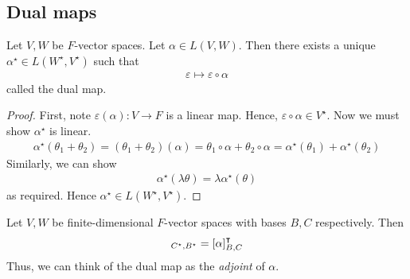 \subsection{Dual maps}
\begin{lemma}
	Let $V, W$ be $F$-vector spaces.
	Let $\alpha \in L(V,W)$.
	Then there exists a unique $\alpha^\star \in L(W^\star, V^\star)$ such that
	\begin{align*}
		\varepsilon \mapsto \varepsilon \circ \alpha
	\end{align*}
	called the dual map.
\end{lemma}
\begin{proof}
	First, note $\varepsilon(\alpha) \colon V \to F$ is a linear map.
	Hence, $\varepsilon \circ \alpha \in V^\star$.
	Now we must show $\alpha^\star$ is linear.
	\begin{align*}
		\alpha^\star(\theta_1 + \theta_2) = (\theta_1 + \theta_2)(\alpha) = \theta_1 \circ \alpha + \theta_2 \circ \alpha = \alpha^\star(\theta_1) + \alpha^\star(\theta_2)
	\end{align*}
	Similarly, we can show
	\begin{align*}
		\alpha^\star(\lambda \theta) = \lambda \alpha^\star(\theta)
	\end{align*}
	as required.
	Hence $\alpha^\star \in L(W^\star, V^\star)$.
\end{proof}
\begin{proposition}
	Let $V, W$ be finite-dimensional $F$-vector spaces with bases $B, C$ respectively.
	Then
	\begin{align*}
		[\alpha^\star]_{C^\star, B^\star} = [\alpha]^\transpose_{B, C}
	\end{align*}
	Thus, we can think of the dual map as the \textit{adjoint} of $\alpha$.
\end{proposition}
